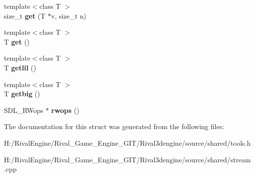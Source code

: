 \begin{DoxyCompactItemize}
\mbox{\label{structstream_a13084a9ab7661e5c6eecb37603257ab8}} 
{\footnotesize template$<$class T $>$ }\\size\+\_\+t {\bfseries get} (T $\ast$v, size\+\_\+t n)
\item 
\mbox{\label{structstream_a10765761d17fe060910b97a6e9e7927a}} 
{\footnotesize template$<$class T $>$ }\\T {\bfseries get} ()
\item 
\mbox{\label{structstream_a95de535e323fc3616d8062b922a30f4b}} 
{\footnotesize template$<$class T $>$ }\\T {\bfseries getlil} ()
\item 
\mbox{\label{structstream_a20499abc6ce3d99b6302321a786604a3}} 
{\footnotesize template$<$class T $>$ }\\T {\bfseries getbig} ()
\item 
\mbox{\label{structstream_aae3c2d8b736350f8b1c136c276c5a633}} 
S\+D\+L\+\_\+\+R\+Wops $\ast$ {\bfseries rwops} ()
\end{DoxyCompactItemize}


The documentation for this struct was generated from the following files\+:\begin{DoxyCompactItemize}
\item 
H\+:/\+Rival\+Engine/\+Rival\+\_\+\+Game\+\_\+\+Engine\+\_\+\+G\+I\+T/\+Rival3dengine/source/shared/tools.\+h\item 
H\+:/\+Rival\+Engine/\+Rival\+\_\+\+Game\+\_\+\+Engine\+\_\+\+G\+I\+T/\+Rival3dengine/source/shared/stream.\+cpp\end{DoxyCompactItemize}
